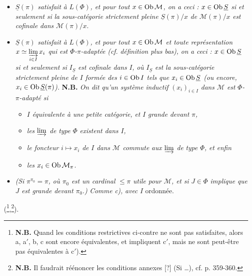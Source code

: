 \begin{itemize}[leftmargin=2.5em]
\item[b)] \textit{$\underline{S}(\pi)$ satisfait à $L(\Phi)$, et pour tout $x\in\operatorname{Ob}\mathcal{M}$, on a ceci : $x\in\operatorname{Ob}\underline{S}$ si et seulement si la sous-catégorie strictement pleine $\underline{S}(\pi)/x$ de $\mathcal{M}(\pi)/x$ est cofinale dans $\mathcal{M}(\pi)/x$}.
\item[\cercle{c}] \textit{$\underline{S}(\pi)$ satisfait à $L(\Phi)$, et pour tout $x\in\operatorname{Ob}\mathcal{M}$ et toute représentation $x\simeq\varinjlim\limits_{i\in I}x_i$ qui est $\Phi$-$\pi$-adaptée (cf. définition plus bas), on a ceci : $x\in\operatorname{Ob}\underline{S}$ si et seulement si $I_{\underline{S}}$ est cofinale dans $I$, où $I_{\underline{S}}$ est la sous-catégorie strictement pleine de $I$ formée des $i\in\operatorname{Ob} I$ tels que $x_i\in\operatorname{Ob}\underline{S}$ (ou encore, $x_i\in\operatorname{Ob}\underline{S}(\pi)$).} \textbf{N.B.} \textit{On dit qu'un système inductif $(x_i)_{i\in I}$ dans $\mathcal{M}$ est $\Phi$-$\pi$-adapté si}
\begin{itemize}[leftmargin=2em]
\item[\textit{1)}] \textit{$I$ équivalente à une petite catégorie, et $I$ grande devant $\pi$,}
\item[\textit{2)}] \textit{les $\varinjlim$ de type $\Phi$ existent dans $I$,}
\item[\textit{3)}] \textit{le foncteur $i\longmapsto x_i$ de $I$ dans $\mathcal{M}$ commute aux $\varinjlim$ de type $\Phi$, et enfin}
\item[\textit{4)}] \textit{les $x_i\in\operatorname{Ob}\mathcal{M}_\pi$.}
\end{itemize}
\item[c$'$)] \textit{(Si $\pi^{\pi_0}=\pi$, où $\pi_0$ est un cardinal $\leqslant\pi$ utile pour $\mathcal{M}$, et si $J\in\Phi$ implique que $J$ est grande devant $\pi_0$.) Comme c), avec $I$} ordonnée.
\end{itemize}
(\footnote{\textbf{N.B.} Quand les conditions restrictives ci-contre ne sont pas satisfaites, alors a, a$'$, b, c sont encore équivalentes, et impliquent c$'$, mais ne sont peut-être pas équivalentes à c$'$).},\footnote{\textbf{N.B.} Il faudrait réénoncer les conditions annexes [?] (Si \dots), cf. p. 359-360.}).

